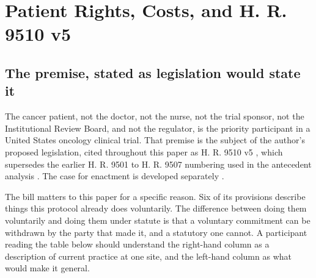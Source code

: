 \section{Patient Rights, Costs, and H. R. 9510 v5}

\subsection{The premise, stated as legislation would state it}

The cancer patient, not the doctor, not the nurse, not the trial sponsor, not
the Institutional Review Board, and not the regulator, is the priority
participant in a United States oncology clinical trial. That premise is the
subject of the author's proposed legislation, cited throughout this paper as
H. R. 9510 v5 \cite{hr9510billv5}, which supersedes the earlier H. R. 9501 to
H. R. 9507 numbering used in the antecedent analysis \cite{paibillprior}. The
case for enactment is developed separately \cite{congress9510, fedlawhr9510}.

The bill matters to this paper for a specific reason. Six of its provisions
describe things this protocol already does voluntarily. The difference between
doing them voluntarily and doing them under statute is that a voluntary
commitment can be withdrawn by the party that made it, and a statutory one
cannot. A participant reading the table below should understand the right-hand
column as a description of current practice at one site, and the left-hand
column as what would make it general.

\vspace{0.30em}

